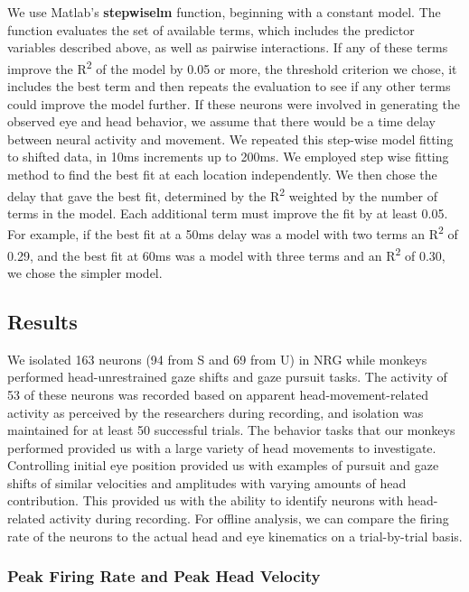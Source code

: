 \documentclass[]{article}
\begin{document}
We use Matlab's \textbf{stepwiselm} function, beginning with a constant
model. The function evaluates the set of available terms, which includes
the predictor variables described above, as well as pairwise
interactions. If any of these terms improve the R\textsuperscript{2} of
the model by 0.05 or more, the threshold criterion we chose, it includes
the best term and then repeats the evaluation to see if any other terms
could improve the model further. If these neurons were involved in
generating the observed eye and head behavior, we assume that there
would be a time delay between neural activity and movement. We repeated
this step-wise model fitting to shifted data, in 10ms increments up to
200ms. We employed step wise fitting method to find the best fit at each
location independently. We then chose the delay that gave the best fit,
determined by the R\textsuperscript{2} weighted by the number of terms
in the model. Each additional term must improve the fit by at least
0.05. For example, if the best fit at a 50ms delay was a model with two
terms an R\textsuperscript{2} of 0.29, and the best fit at 60ms was a
model with three terms and an R\textsuperscript{2} of 0.30, we chose the
simpler model.

\subsection{Results}\label{results}

We isolated 163 neurons (94 from S and 69 from U) in NRG while monkeys
performed head-unrestrained gaze shifts and gaze pursuit tasks. The
activity of 53 of these neurons was recorded based on apparent
head-movement-related activity as perceived by the researchers during
recording, and isolation was maintained for at least 50 successful
trials. The behavior tasks that our monkeys performed provided us with a
large variety of head movements to investigate. Controlling initial eye
position provided us with examples of pursuit and gaze shifts of similar
velocities and amplitudes with varying amounts of head contribution.
This provided us with the ability to identify neurons with head-related
activity during recording. For offline analysis, we can compare the
firing rate of the neurons to the actual head and eye kinematics on a
trial-by-trial basis.

\subsubsection{Peak Firing Rate and Peak Head
Velocity}\label{peak-firing-rate-and-peak-head-velocity}
\end{document}
